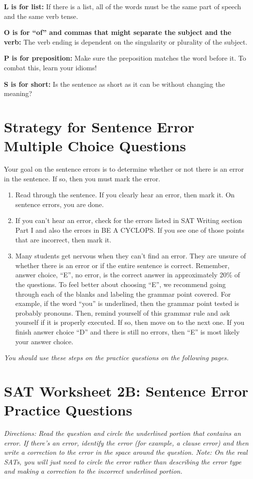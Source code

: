 \bigskip
\textbf{L is for list:} If there is a list, all of the words must be the same part of speech and the same verb tense. 

\bigskip
\textbf{O is for “of” and commas that might separate the subject and the verb:} The verb ending is dependent on the singularity or plurality of the subject.

\bigskip
\textbf{P is for preposition:} Make sure the preposition matches the word before it. To combat this, learn your idioms!

\bigskip
\textbf{S is for short:} Is the sentence as short as it can be without changing the meaning? 

\newpage
\section[Sentence Error]{Strategy for Sentence Error Multiple Choice Questions}

Your goal on the sentence errors is to determine whether or not there is an error in the sentence. If so, then you must mark the error.

\begin{enumerate}
\item{Read through the sentence. If you clearly hear an error, then mark it. On sentence errors, you are done.}
\vfill\item{If you can't hear an error, check for the errors listed in SAT Writing section Part I and also the errors in BE A CYCLOPS. If you see one of those points that are incorrect, then mark it.} 
\vfill\item{Many students get nervous when they can't find an error. They are unsure of whether there is an error or if the entire sentence is correct. Remember, answer choice, “E”, no error, is the correct answer in approximately 20\% of the questions. To feel better about choosing “E”, we recommend going through each of the blanks and labeling the grammar point covered. For example, if the word “you” is underlined, then the grammar point tested is probably pronouns. Then, remind yourself of this grammar rule and ask yourself if it is properly executed. If so, then move on to the next one. If you finish answer choice “D” and there is still no errors, then “E” is most likely your answer choice.}
\end{enumerate}

\vfill\textit{You should use these steps on the practice questions on the following pages.}
\newpage

\section[Sentence Error Practice]{SAT Worksheet 2B: Sentence Error Practice Questions}
\textit{Directions: Read the question and circle the underlined portion that contains an error. If there's an error, identify the error (for example, a clause error) and then write a correction to the error in the space around the question. Note: On the real SATs, you will just need to circle the error rather than describing the error type and making a correction to the incorrect underlined portion.}

